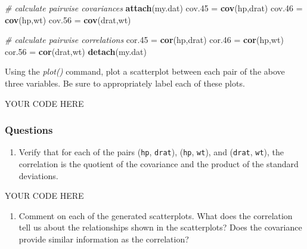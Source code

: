 \documentclass[
]{article}
\newenvironment{Shaded}{\begin{snugshade}}{\end{snugshade}}
\newcommand{\CommentTok}[1]{\textcolor[rgb]{0.56,0.35,0.01}{\textit{#1}}}
\newcommand{\FloatTok}[1]{\textcolor[rgb]{0.00,0.00,0.81}{#1}}
\newcommand{\KeywordTok}[1]{\textcolor[rgb]{0.13,0.29,0.53}{\textbf{#1}}}
\newcommand{\NormalTok}[1]{#1}
\newcommand{\StringTok}[1]{\textcolor[rgb]{0.31,0.60,0.02}{#1}}
\providecommand{\tightlist}{%
  \setlength{\itemsep}{0pt}\setlength{\parskip}{0pt}}
\begin{document}
\begin{Shaded}
\begin{Highlighting}[]
\CommentTok{# calculate pairwise covariances}
\KeywordTok{attach}\NormalTok{(my.dat)}
\NormalTok{cov}\FloatTok{.45}\NormalTok{ =}\StringTok{ }\KeywordTok{cov}\NormalTok{(hp,drat)}
\NormalTok{cov}\FloatTok{.46}\NormalTok{ =}\StringTok{ }\KeywordTok{cov}\NormalTok{(hp,wt)}
\NormalTok{cov}\FloatTok{.56}\NormalTok{ =}\StringTok{ }\KeywordTok{cov}\NormalTok{(drat,wt)}

\CommentTok{# calculate pairwise correlations}
\NormalTok{cor}\FloatTok{.45}\NormalTok{ =}\StringTok{ }\KeywordTok{cor}\NormalTok{(hp,drat)}
\NormalTok{cor}\FloatTok{.46}\NormalTok{ =}\StringTok{ }\KeywordTok{cor}\NormalTok{(hp,wt)}
\NormalTok{cor}\FloatTok{.56}\NormalTok{ =}\StringTok{ }\KeywordTok{cor}\NormalTok{(drat,wt)}
\KeywordTok{detach}\NormalTok{(my.dat)}
\end{Highlighting}
\end{Shaded}

Using the \emph{plot()} command, plot a scatterplot between each pair of
the above three variables. Be sure to appropriately label each of these
plots.

\begin{Shaded}
\begin{Highlighting}[]
\NormalTok{YOUR CODE HERE}
\end{Highlighting}
\end{Shaded}

\hypertarget{questions-3}{%
\subsubsection{Questions}\label{questions-3}}

\begin{enumerate}
\def\labelenumi{\arabic{enumi}.}
\tightlist
\item
  Verify that for each of the pairs (\texttt{hp}, \texttt{drat}),
  (\texttt{hp}, \texttt{wt}), and (\texttt{drat}, \texttt{wt}), the
  correlation is the quotient of the covariance and the product of the
  standard deviations.
\end{enumerate}

\begin{Shaded}
\begin{Highlighting}[]
\NormalTok{YOUR CODE HERE}
\end{Highlighting}
\end{Shaded}

\begin{enumerate}
\def\labelenumi{\arabic{enumi}.}
\setcounter{enumi}{1}
\tightlist
\item
  Comment on each of the generated scatterplots. What does the
  correlation tell us about the relationships shown in the scatterplots?
  Does the covariance provide similar information as the correlation?
\end{enumerate}
\end{document}
